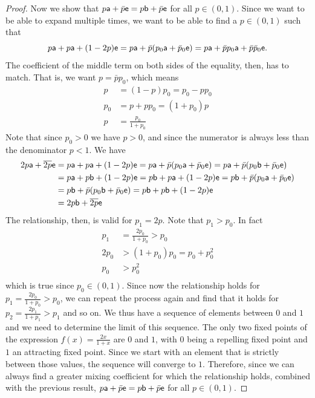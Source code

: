 \begin{mathSection}
\begin{proof}
	Now we show that $p\ens[a] + \bar{p} \ens = p \ens[b] + \bar{p} \ens$ for all $p \in (0,1)$. Since we want to be able to expand multiple times, we want to be able to find a $p \in (0,1)$ such that
	\begin{equation}
		p \ens[a] + p \ens[a] + (1-2p) \ens = p \ens[a] + \bar{p} (p_0 \ens[a] + \bar{p}_0 \ens)= p \ens[a] + \bar{p} p_0 \ens[a] + \bar{p} \bar{p}_0 \ens.
	\end{equation}
	The coefficient of the middle term on both sides of the equality, then, has to match. That is, we want $p = \bar{p} p_0$, which means
	\begin{equation}
		\begin{aligned}
			p&=(1-p)p_0=p_0 - p p_0 \\
			p_0 &= p + p p_0 = (1+p_0) p  \\
			p &= \frac{p_0}{1+p_0}
		\end{aligned}
	\end{equation}
	Note that since $p_0 > 0$ we have $p>0$, and since the numerator is always less than the denominator $p < 1$. We have
	\begin{equation}
		\begin{aligned}
			2p \ens[a] + \overline{2p} \ens &=  p \ens[a] + p \ens[a] + (1-2p) \ens =  p \ens[a] + \bar{p} (p_0 \ens[a] + \bar{p}_0 \ens) = p \ens[a] + \bar{p} (p_0 \ens[b] + \bar{p}_0 \ens) \\
			&= p \ens[a] + p \ens[b] + (1-2p) \ens = p \ens[b] + p \ens[a] + (1-2p) \ens = p \ens[b] + \bar{p} (p_0 \ens[a] + \bar{p}_0 \ens) \\
			&= p \ens[b] + \bar{p} (p_0 \ens[b] + \bar{p}_0 \ens) = p \ens[b] + p \ens[b] + (1-2p) \ens \\
			&= 2p \ens[b] + \overline{2p} \ens
		\end{aligned}
	\end{equation}
	The relationship, then, is valid for $p_1 = 2p$. Note that $p_1 > p_0$. In fact
	\begin{equation}
		\begin{aligned}
			p_1 &= \frac{2p_0}{1+p_0} > p_0  \\
			2 p_0 &> (1+p_0) p_0 = p_0 + p_0^2 \\
			p_0 &> p_0^2 \\
		\end{aligned}
	\end{equation}
	which is true since $p_0 \in (0,1)$. Since now the relationship holds for $p_1 = \frac{2 p_0}{1+p_0} > p_0 $, we can repeat the process again and find that it holds for $p_2 = \frac{2 p_1}{1+p_1} > p_1$ and so on. We thus have a sequence of elements between $0$ and $1$ and we need to determine the limit of this sequence. The only two fixed points of the expression $f(x) = \frac{2x}{1+x}$ are $0$ and $1$, with $0$ being a repelling fixed point and $1$ an attracting fixed point. Since we start with an element that is strictly between those values, the sequence will converge to $1$. Therefore, since we can always find a greater mixing coefficient for which the relationship holds, combined with the previous result, $p\ens[a] + \bar{p} \ens = p \ens[b] + \bar{p} \ens$ for all $p \in (0,1)$.
	

\end{proof}
\end{mathSection}

